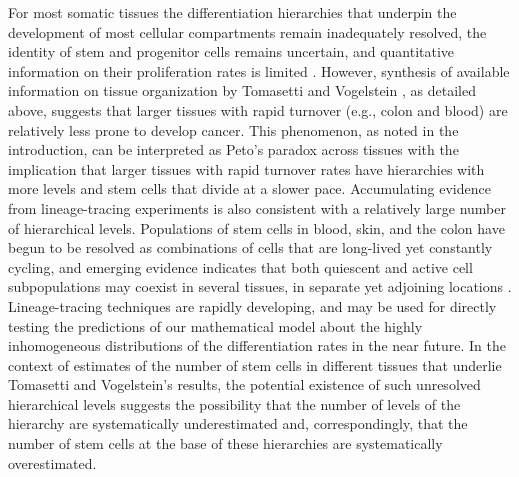 \documentclass[aps,singlecolumn]{revtex4-1}
\begin{document}
For most somatic tissues the differentiation hierarchies that underpin
the development of most cellular compartments remain inadequately
resolved, the identity of stem and progenitor cells remains uncertain,
and quantitative information on their proliferation rates is limited
\cite{Sutherland:2015}. However, synthesis of available information on
tissue organization by Tomasetti and Vogelstein \cite{Tomasetti:2015},
as detailed above, suggests that larger tissues with rapid turnover
(e.g., colon and blood) are relatively less prone to develop cancer.
This phenomenon, as noted in the introduction, can be interpreted as Peto's paradox across tissues
with the implication that larger tissues with rapid turnover rates have
hierarchies with more levels and stem cells that divide at a slower
pace. Accumulating evidence from lineage-tracing experiments
\cite{Blanpain:2013}
is also consistent with a relatively large number of hierarchical levels.
Populations of stem cells in blood, skin, and the
colon have begun to be resolved as combinations of cells that are
long-lived yet constantly cycling,
and emerging
evidence indicates that both quiescent and active cell subpopulations
may coexist in several tissues, in separate yet adjoining locations
\cite{Li:2010}.
Lineage-tracing techniques \cite{Blanpain:2013} are rapidly
developing, and may be used for directly testing the predictions of our
mathematical model about the highly inhomogeneous distributions of
the differentiation rates in the near future. In the context of estimates of
the number of stem cells in different tissues that underlie
Tomasetti and Vogelstein's results, the potential existence of such
unresolved hierarchical levels suggests the possibility that the number
of levels of the hierarchy are systematically underestimated and,
correspondingly, that the number of stem cells at the base of these
hierarchies are systematically overestimated.
\end{document}
